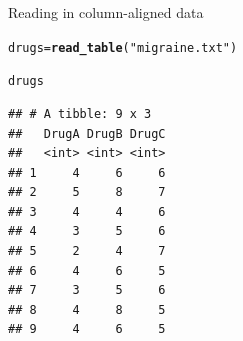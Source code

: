 \documentclass[unknownkeysallowed]{beamer}\usepackage[]{graphicx}\usepackage[]{color}
\makeatletter
\newcommand{\hlstr}[1]{\textcolor[rgb]{0.192,0.494,0.8}{#1}}%
\newcommand{\hlstd}[1]{\textcolor[rgb]{0.345,0.345,0.345}{#1}}%
\newcommand{\hlkwb}[1]{\textcolor[rgb]{0.69,0.353,0.396}{#1}}%
\newcommand{\hlkwd}[1]{\textcolor[rgb]{0.737,0.353,0.396}{\textbf{#1}}}%
\newenvironment{kframe}{%
 \def\at@end@of@kframe{}%
 \ifinner\ifhmode%
  \def\at@end@of@kframe{\end{minipage}}%
  \begin{minipage}{\columnwidth}%
 \fi\fi%
 \def\FrameCommand##1{\hskip\@totalleftmargin \hskip-\fboxsep
 \colorbox{shadecolor}{##1}\hskip-\fboxsep
     \hskip-\linewidth \hskip-\@totalleftmargin \hskip\columnwidth}%
 \MakeFramed {\advance\hsize-\width
   \@totalleftmargin\z@ \linewidth\hsize
   \@setminipage}}%
 {\par\unskip\endMakeFramed%
 \at@end@of@kframe}
\newenvironment{knitrout}{}{} %
\makeatother
\begin{document}
\begin{frame}[fragile]{Reading in column-aligned data}
  
  \begin{multicols}{2}
\begin{knitrout}\small
{}\color{fgcolor}\begin{kframe}
\begin{alltt}
\hlstd{drugs}\hlkwb{=}\hlkwd{read_table}\hlstd{(}\hlstr{"migraine.txt"}\hlstd{)}
\end{alltt}


{\ttfamily\noindent\itshape\color{messagecolor}{\#\# Parsed with column specification:\\\#\# cols(\\\#\#\ \  DrugA = col\_integer(),\\\#\#\ \  DrugB = col\_integer(),\\\#\#\ \  DrugC = col\_integer()\\\#\# )}}\end{kframe}
\end{knitrout}

\begin{knitrout}
\color{fgcolor}\begin{kframe}
\begin{alltt}
\hlstd{drugs}
\end{alltt}
\begin{verbatim}
## # A tibble: 9 x 3
##   DrugA DrugB DrugC
##   <int> <int> <int>
## 1     4     6     6
## 2     5     8     7
## 3     4     4     6
## 4     3     5     6
## 5     2     4     7
## 6     4     6     5
## 7     3     5     6
## 8     4     8     5
## 9     4     6     5
\end{verbatim}
\end{kframe}
\end{knitrout}
    
  \end{multicols}

\end{frame}
\end{document}
